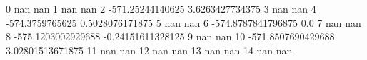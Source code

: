 0 nan nan
1 nan nan
2 -571.25244140625 3.6263427734375
3 nan nan
4 -574.3759765625 0.5028076171875
5 nan nan
6 -574.8787841796875 0.0
7 nan nan
8 -575.1203002929688 -0.24151611328125
9 nan nan
10 -571.8507690429688 3.02801513671875
11 nan nan
12 nan nan
13 nan nan
14 nan nan
